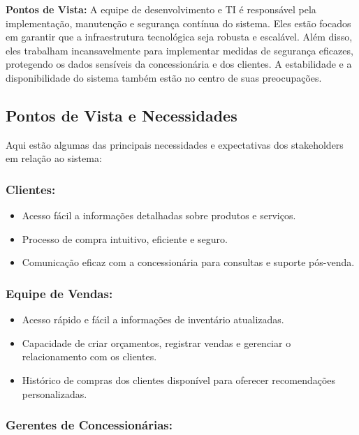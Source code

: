 \textbf{Pontos de Vista:} A equipe de desenvolvimento e TI é responsável pela implementação, manutenção e segurança contínua do sistema. Eles estão focados em garantir que a infraestrutura tecnológica seja robusta e escalável. Além disso, eles trabalham incansavelmente para implementar medidas de segurança eficazes, protegendo os dados sensíveis da concessionária e dos clientes. A estabilidade e a disponibilidade do sistema também estão no centro de suas preocupações.

\subsection{Pontos de Vista e Necessidades}

Aqui estão algumas das principais necessidades e expectativas dos stakeholders em relação ao sistema:

\subsubsection{Clientes:}

\begin{itemize}
	\item Acesso fácil a informações detalhadas sobre produtos e serviços.
	\item Processo de compra intuitivo, eficiente e seguro.
	\item Comunicação eficaz com a concessionária para consultas e suporte pós-venda.
\end{itemize}

\subsubsection{Equipe de Vendas:}

\begin{itemize}
	\item Acesso rápido e fácil a informações de inventário atualizadas.
	\item Capacidade de criar orçamentos, registrar vendas e gerenciar o relacionamento com os clientes.
	\item Histórico de compras dos clientes disponível para oferecer recomendações personalizadas.
\end{itemize}

\subsubsection{Gerentes de Concessionárias:}

